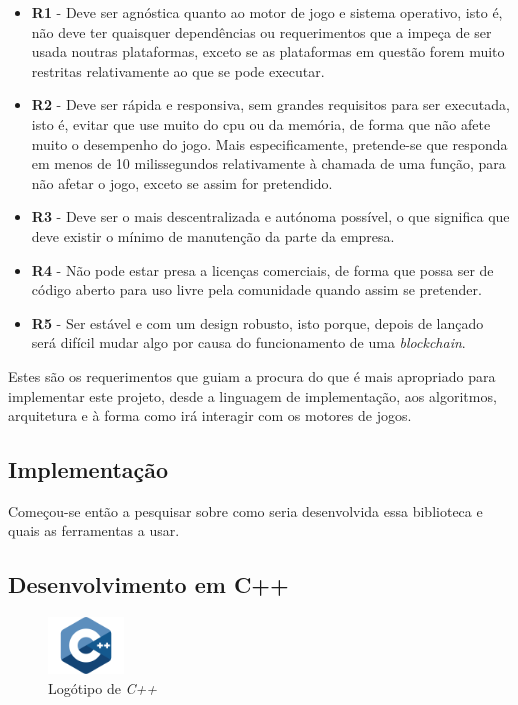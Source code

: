 \begin{itemize}
    \item
          \textbf{R1} - Deve ser agnóstica quanto ao motor de jogo e sistema operativo, isto é, não deve ter quaisquer dependências ou requerimentos que a impeça de ser usada noutras plataformas, exceto se as plataformas em questão forem muito restritas relativamente ao que se pode executar.
    \item
          \textbf{R2} - Deve ser rápida e responsiva, sem grandes requisitos para ser executada, isto é, evitar que use muito do \acrfull{cpu} ou da memória, de forma que não afete muito o desempenho do jogo. Mais especificamente, pretende-se que responda em menos de 10 milissegundos relativamente à chamada de uma função, para não afetar o jogo, exceto se assim for pretendido.
    \item
          \textbf{R3} - Deve ser o mais descentralizada e autónoma possível, o que significa que deve existir o mínimo de manutenção da parte da empresa.
    \item
          \textbf{R4} - Não pode estar presa a licenças comerciais,
          de forma que possa ser de código aberto para uso livre pela comunidade quando assim se pretender.
    \item
          \textbf{R5} - Ser estável e com um design robusto, isto porque, depois de lançado será difícil mudar algo por causa do funcionamento de uma \textit{blockchain}.

\end{itemize}

Estes são os requerimentos que guiam a procura do que é mais apropriado para implementar este projeto, desde a linguagem de implementação, aos algoritmos, arquitetura e à forma como irá interagir com os motores de jogos.

\subsection{Implementação}

Começou-se então a pesquisar sobre como seria desenvolvida essa biblioteca e quais as ferramentas a usar.

\subsection{Desenvolvimento em C++}

\begin{figure}
    \includegraphics[width=2cm]{images/cpp.png}
    \caption{Logótipo de \textit{C++}}
    \label{fig:cpp-logo}
\end{figure}

